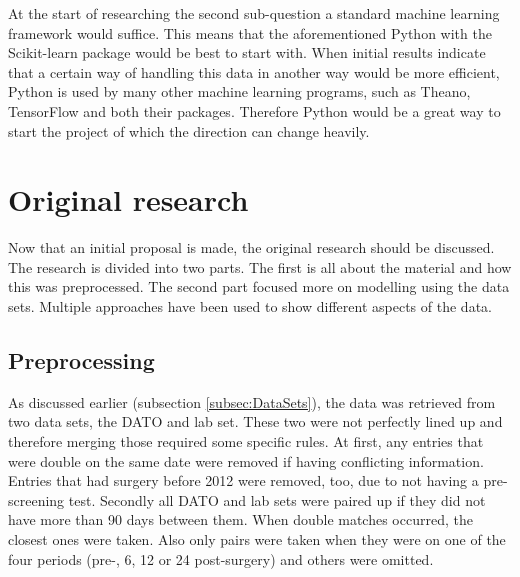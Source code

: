 \documentclass[10pt,a4paper]{report}
\begin{document}
	At the start of researching the second sub-question a standard machine learning framework would suffice. This means that the aforementioned Python with the Scikit-learn package would be best to start with. When initial results indicate that a certain way of handling this data in another way would be more efficient, Python is used by many other machine learning programs, such as Theano, TensorFlow and both their packages. Therefore Python would be a great way to start the project of which the direction can change heavily.
	
	\clearpage
	
	\section{Original research}
	\label{sec:OriginalResearch}
	
	Now that an initial proposal is made, the original research should be discussed. The research is divided into two parts. The first is all about the material and how this was preprocessed. The second part focused more on modelling using the data sets. Multiple approaches have been used to show different aspects of the data.
	
	\subsection{Preprocessing}
	\label{subsec:Preprocessing}
	
	As discussed earlier (subsection \ref{subsec:DataSets}), the data was retrieved from two data sets, the DATO and lab set. These two were not perfectly lined up and therefore merging those required some specific rules. At first, any entries that were double on the same date were removed if having conflicting information. Entries that had surgery before 2012 were removed, too, due to not having a pre-screening test. Secondly all DATO and lab sets were paired up if they did not have more than 90 days between them. When double matches occurred, the closest ones were taken. Also only pairs were taken when they were on one of the four periods (pre-, 6, 12 or 24 post-surgery) and others were omitted.
	
\end{document}
